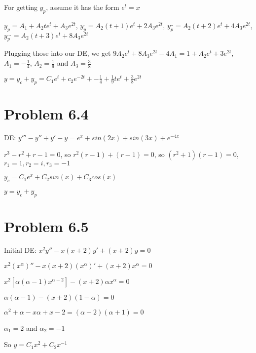 \documentclass{article}
\begin{document}
\noindent For getting $y_{p}$, assume it has the form $e^{t} = x$ \par
\noindent $y_{p} = A_{1} + A_{2}te^{t} + A_{3}e^{2t}$, $y_{p}^{.} = A_{2}(t + 1)e^{t} + 2A_{3}e^{2t}$, $y_{p}^{..} = A_{2}(t + 2)e^{t} + 4A_{3}e^{2t}$, $y_{p}^{...} = A_{2}(t + 3)e^{t} + 8A_{3}e^{2t}$ \par\vspace{0.25cm}

\noindent Plugging those into our DE, we get $9A_{2}e^{t} + 8A_{3}e^{2t} - 4A_{1} = 1 + A_{2}e^{t} + 3e^{2t}$, $A_{1} = -\frac{1}{4}$, $A_{2} = \frac{1}{9}$ and $A_{3} = \frac{3}{8}$ \par\vspace{0.25cm}

\noindent $y = y_{c} + y_{p} = C_{1}e^{t} + c_{2}e^{-2t} + -\frac{1}{4} + \frac{1}{9}te^{t} + \frac{3}{8}e^{2t}$

\section{Problem 6.4}

\noindent DE: $y''' - y'' + y' - y = e^{x} + sin(2x) + sin(3x) + e^{-4x}$ \par

\noindent $r^{3} - r^{2} + r -1 = 0$, so $r^{2}(r - 1) + (r - 1) = 0$, so $(r^{2} + 1)(r - 1) = 0$, $r_{1} = 1, r_{2} = i, r_{3} = -1$ \par
\noindent $y_{c} = C_{1}e^{x} + C_{2}sin(x) + C_{3}cos(x)$ \par\vspace{0.25cm}

\noindent 

\noindent $y = y_{c} + y_{p}$

\section{Problem 6.5}

\noindent Initial DE: $x^{2}y'' - x(x + 2)y' + (x + 2)y = 0$ \par
\noindent $x^{2}(x^{\alpha})'' - x(x + 2)(x^{\alpha})' + (x + 2)x^{\alpha} = 0$ \par
\noindent $x^{2}[\alpha (\alpha - 1)x^{\alpha - 2}] - (x + 2)\alpha x^{\alpha} = 0$ \par
\noindent $\alpha (\alpha - 1) - (x + 2)(1 - \alpha) = 0$ \par
\noindent $\alpha ^{2} + \alpha - x\alpha + x - 2 = (\alpha - 2)(\alpha + 1) = 0$ \par
\noindent $\alpha_{1} = 2$ and $\alpha_{2} = -1$ \par
\noindent So $y = C_{1}x^{2} + C_{2}x^{-1}$
\end{document}
